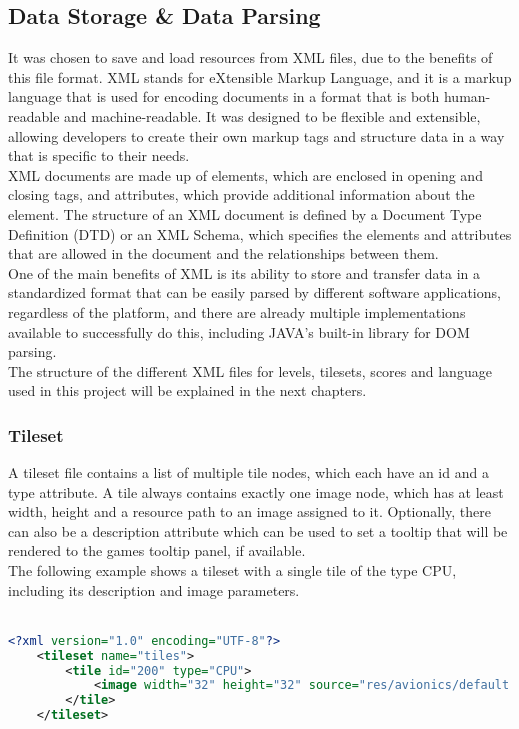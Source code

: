 \subsection{Data Storage \& Data Parsing}\label{subsec:data-storage-&-data-parsing}
It was chosen to save and load resources from XML files, due to the benefits of this file format.
XML stands for eXtensible Markup Language, and it is a markup language that is used for encoding documents in a format that is both human-readable and machine-readable.
It was designed to be flexible and extensible, allowing developers to create their own markup tags and structure data in a way that is specific to their needs.
\\
XML documents are made up of elements, which are enclosed in opening and closing tags, and attributes, which provide additional information about the element.
The structure of an XML document is defined by a Document Type Definition (DTD) or an XML Schema, which specifies the elements and attributes that are allowed in the document and the relationships between them.
\\
One of the main benefits of XML is its ability to store and transfer data in a standardized format that can be easily parsed by different software applications, regardless of the platform, and there are
already multiple implementations available to successfully do this, including JAVA's built-in library for DOM parsing.
\\
The structure of the different XML files for levels, tilesets, scores and language used in this project will be explained in the next chapters.
\subsubsection{Tileset}\label{subsubsec:tileset}
A tileset file contains a list of multiple tile nodes, which each have an id and a type attribute.
A tile always contains exactly one image node, which has at least width, height and a resource path to an image assigned to it.
Optionally, there can also be a description attribute which can be used to set a tooltip that will be rendered to the games tooltip panel, if available.
\\
The following example shows a tileset with a single tile of the type CPU, including its description and image parameters.
\\ \\
\begin{lstlisting}[language=XML,label={lst:tileset-xml}]
    <?xml version="1.0" encoding="UTF-8"?>
    <tileset name="tiles">
        <tile id="200" type="CPU">
            <image width="32" height="32" source="res/avionics/default.png" description="Default CPU Component"/>
        </tile>
    </tileset>
\end{lstlisting}
